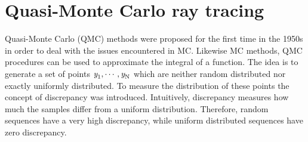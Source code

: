 \section{Quasi-Monte Carlo ray tracing} 
Quasi-Monte Carlo (QMC) methods were proposed for the first time in the 1950s in order to deal with the issues encountered in MC. 
Likewise MC methods, QMC procedures can be used to approximate the integral of a function. 
The idea is to generate a set of points $\textit{y}_1, \cdots, \textit{y}_{\textrm{N}}$ which are neither random distributed nor exactly uniformly distributed. 
To measure the distribution of these points the concept of discrepancy was introduced.  Intuitively, discrepancy measures how much the samples differ from a uniform distribution. 
Therefore, random sequences have a very high discrepancy, while uniform distributed sequences have zero discrepancy.
 \begin{definition} 

\end{definition}





















